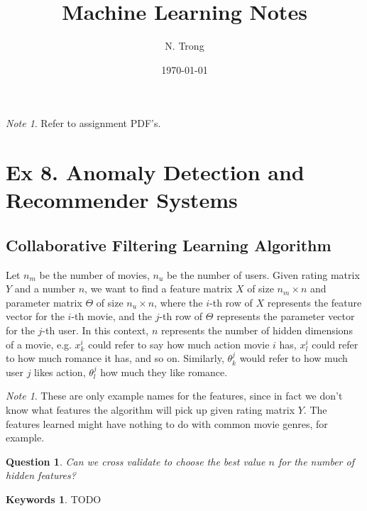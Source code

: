 \documentclass[12pt]{article}
\title{Machine Learning Notes}
\author{N. Trong}
\date{\today}                                           %
\theoremstyle{plain}
\newtheorem{quest}[thm]{Question}
\theoremstyle{definition}
\newtheorem*{keywords}{Keywords}
\theoremstyle{remark}
\newtheorem{note}[thm]{Note}
\begin{document}
\maketitle

\begin{note}
Refer to assignment PDF's.
\end{note}

\section{Ex 8. Anomaly Detection and Recommender Systems}

\subsection{Collaborative Filtering Learning Algorithm}

Let $n_m$ be the number of movies, $n_u$ be the number of users. Given rating matrix $Y$ and a number $n$, we want to find a feature matrix $X$ of size $n_m \times n$ and parameter matrix $\Theta$ of size $n_u \times n$, where the $i$-th row of $X$ represents the feature vector for the $i$-th movie, and the $j$-th row of $\Theta$ represents the parameter vector for the $j$-th user. In this context, $n$ represents the number of hidden dimensions of a movie, e.g. $x^i_k$ could refer to say how much action movie $i$ has, $x^i_l$ could refer to how much romance it has, and so on. Similarly, $\theta^j_k$ would refer to how much user $j$ likes action, $\theta^j_l$ how much they like romance.

\begin{note}
These are only example names for the features, since in fact we don't know what features the algorithm will pick up given rating matrix $Y$. The features learned might have nothing to do with common movie genres, for example.
\end{note}

\begin{quest}
Can we cross validate to choose the best value $n$ for the number of hidden features?
\end{quest}

\begin{keywords}
TODO
\end{keywords}
\end{document}
